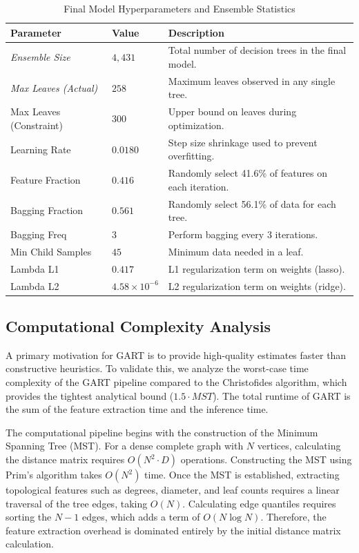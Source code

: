 \documentclass{article}
\begin{document}
\begin{table}[!ht]
\centering
\caption{Final Model Hyperparameters and Ensemble Statistics}
\label{tab:hyperparams}
\begin{tabular}{llp{7cm}}
\toprule
\textbf{Parameter} & \textbf{Value} & \textbf{Description} \\ \midrule
\textit{Ensemble Size} & $4,431$ & Total number of decision trees in the final model. \\
\textit{Max Leaves (Actual)} & $258$ & Maximum leaves observed in any single tree. \\
Max Leaves (Constraint) & $300$ & Upper bound on leaves during optimization. \\
Learning Rate & $0.0180$ & Step size shrinkage used to prevent overfitting. \\
Feature Fraction & $0.416$ & Randomly select 41.6\% of features on each iteration. \\
Bagging Fraction & $0.561$ & Randomly select 56.1\% of data for each tree. \\
Bagging Freq & $3$ & Perform bagging every 3 iterations. \\
Min Child Samples & $45$ & Minimum data needed in a leaf. \\
Lambda L1 & $0.417$ & L1 regularization term on weights (lasso). \\
Lambda L2 & $4.58 \times 10^{-6}$ & L2 regularization term on weights (ridge). \\ \bottomrule
\end{tabular}
\end{table}

\subsection{Computational Complexity Analysis}

A primary motivation for GART is to provide high-quality estimates faster than constructive heuristics. To validate this, we analyze the worst-case time complexity of the GART pipeline compared to the Christofides algorithm, which provides the tightest analytical bound ($1.5 \cdot MST$). The total runtime of GART is the sum of the feature extraction time and the inference time.

The computational pipeline begins with the construction of the Minimum Spanning Tree (MST). For a dense complete graph with $N$ vertices, calculating the distance matrix requires $O(N^2 \cdot D)$ operations. Constructing the MST using Prim's algorithm takes $O(N^2)$ time. Once the MST is established, extracting topological features such as degrees, diameter, and leaf counts requires a linear traversal of the tree edges, taking $O(N)$. Calculating edge quantiles requires sorting the $N-1$ edges, which adds a term of $O(N \log N)$. Therefore, the feature extraction overhead is dominated entirely by the initial distance matrix calculation.
\end{document}
